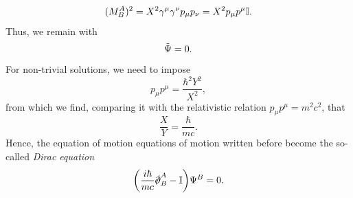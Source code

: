 \begin{equation}
    (M_B^A)^2 = X^2\gamma^\mu\gamma^\nu p_\mu p_\nu = X^2p_\mu p^\mu \mathbb{I}.
\end{equation}
Thus, we remain with 
\begin{equation}
    [X^2p_\mu p^\mu - (\hbar Y)^2]\t{\Psi} = 0.
\end{equation}
For non-trivial solutions, we need to impose 
\begin{equation}
    p_\mu p^\mu = \frac{\hbar^2Y^2}{X^2},
\end{equation}
from which we find, comparing it with the relativistic relation $p_\mu p^\mu = m^2c^2$, that 
\begin{equation}
    \frac{X}{Y} = \frac{\hbar}{mc}.
\end{equation}
Hence, the equation of motion  equations of motion written before become the so-called \emph{Dirac equation}
\begin{equation}
    \bigg(\frac{i\hbar}{mc}\sl{\p}_B^A - \IM\bigg)\Psi^B = 0.
\end{equation}

